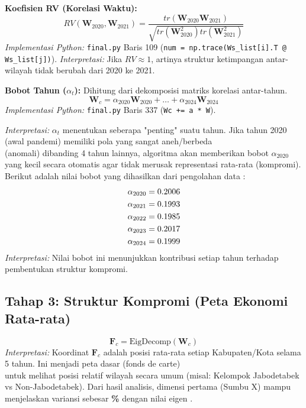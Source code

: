 \textbf{Koefisien RV (Korelasi Waktu):}
\begin{equation}
    RV(\mathbf{W}_{2020}, \mathbf{W}_{2021}) = \frac{tr(\mathbf{W}_{2020} \mathbf{W}_{2021})}{\sqrt{tr(\mathbf{W}_{2020}^2) tr(\mathbf{W}_{2021}^2)}}
\end{equation}
\textit{Implementasi Python:} \texttt{final.py} Baris 109 (\texttt{num = np.trace(Ws\_list[i].T @ Ws\_list[j])}).
\textit{Interpretasi:} Jika $RV \approx 1$, artinya struktur ketimpangan antar-wilayah tidak berubah dari 2020 ke 2021.




\textbf{Bobot Tahun ($\alpha_t$):}
Dihitung dari dekomposisi matriks korelasi antar-tahun.
\begin{equation}
    \mathbf{W}_c = \alpha_{2020}\mathbf{W}_{2020} + \dots + \alpha_{2024}\mathbf{W}_{2024}
\end{equation}
\textit{Implementasi Python:} \texttt{final.py} Baris 337 (\texttt{Wc += a * W}).

\textit{Interpretasi:} $\alpha_t$ menentukan seberapa "penting" suatu tahun. Jika tahun 2020 (awal pandemi) memiliki pola yang sangat aneh/berbeda \\ (anomali) dibanding 4 tahun lainnya, algoritma akan memberikan bobot $\alpha_{2020}$ yang kecil secara otomatis agar tidak merusak representasi rata-rata (kompromi).
Berikut adalah nilai bobot yang dihasilkan dari pengolahan data \textbf{\statisDatasetName}:
\begin{align*}
    \alpha_{2020} &= 0.2006 \\
    \alpha_{2021} &= 0.1993 \\
    \alpha_{2022} &= 0.1985 \\
    \alpha_{2023} &= 0.2017 \\
    \alpha_{2024} &= 0.1999
\end{align*}
\textit{Interpretasi:} Nilai bobot ini menunjukkan kontribusi setiap tahun terhadap pembentukan struktur kompromi.

\subsection*{Tahap 3: Struktur Kompromi (Peta Ekonomi Rata-rata)}
\begin{equation}
    \mathbf{F}_c = \text{EigDecomp}(\mathbf{W}_c)
\end{equation}
\textit{Interpretasi:} Koordinat $\mathbf{F}_c$ adalah posisi rata-rata setiap Kabupaten/Kota selama 5 tahun. Ini menjadi peta dasar (fonds de carte) \\ untuk melihat posisi relatif wilayah secara umum (misal: Kelompok Jabodetabek vs Non-Jabodetabek).
Dari hasil analisis, dimensi pertama (Sumbu X) mampu menjelaskan variansi sebesar \textbf{\statisInertiaA\%} dengan nilai eigen \textbf{\statisEigenA}.

